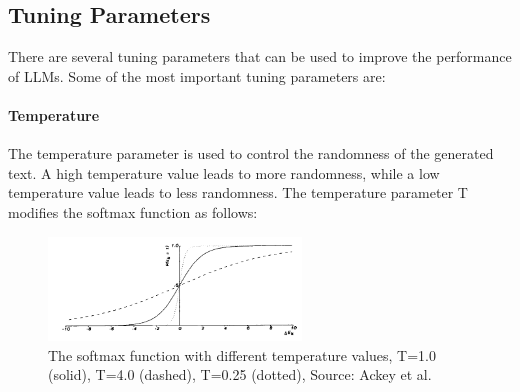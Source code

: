 

\subsection{Tuning Parameters}

There are several tuning parameters that can be used to improve the performance of LLMs. Some of the most important tuning parameters are:

\paragraph{Temperature}
The temperature parameter is used to control the randomness of the generated text. A high temperature value leads to more randomness, while a low temperature value leads to less randomness. The temperature parameter T modifies the softmax function as follows:

\begin{figure}[h!]
    \centering
    \includegraphics[width=0.6\textwidth]{images/temperature.png}
    \caption{The softmax function with different temperature values, T=1.0 (solid), T=4.0 (dashed), T=0.25 (dotted), Source: Ackey et al.\cite{ACKLEY.1985}}
    \label{fig:temperature}
\end{figure}

